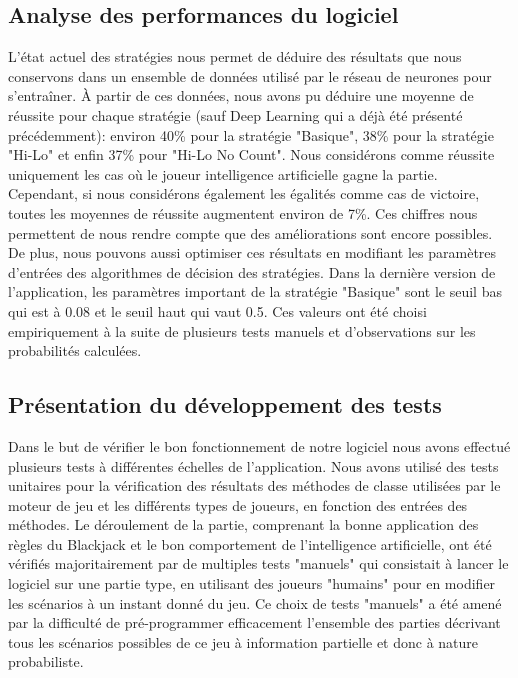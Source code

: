\subsection{Analyse des performances du logiciel}
L'état actuel des stratégies nous permet de déduire des résultats que nous conservons dans un ensemble de données utilisé par le réseau de neurones pour s'entraîner. À partir de ces données, nous avons pu déduire une moyenne de réussite pour chaque stratégie (sauf Deep Learning qui a déjà été présenté précédemment): environ 40\% pour la stratégie "Basique", 38\% pour la stratégie "Hi-Lo" et enfin 37\% pour "Hi-Lo No Count". Nous considérons comme réussite uniquement les cas où le joueur intelligence artificielle gagne la partie. Cependant, si nous considérons également les égalités comme cas de victoire, toutes les moyennes de réussite augmentent environ de 7\%. Ces chiffres nous permettent de nous rendre compte que des améliorations sont encore possibles. De plus, nous pouvons aussi optimiser ces résultats en modifiant les paramètres d'entrées des algorithmes de décision des stratégies. Dans la dernière version de l'application, les paramètres important de la stratégie "Basique" sont le seuil bas qui est à 0.08 et le seuil haut qui vaut 0.5. Ces valeurs ont été choisi empiriquement à la suite de plusieurs tests manuels et d'observations sur les probabilités calculées.

\subsection{Présentation du développement des tests}
Dans le but de vérifier le bon fonctionnement de notre logiciel nous avons effectué plusieurs tests à différentes échelles de l'application. Nous avons utilisé des tests unitaires pour la vérification des résultats des méthodes de classe utilisées par le moteur de jeu et les différents types de joueurs, en fonction des entrées des méthodes. Le déroulement de la partie, comprenant la bonne application des règles du Blackjack et le bon comportement de l'intelligence artificielle, ont été vérifiés majoritairement par de multiples tests "manuels" qui consistait à lancer le logiciel sur une partie type, en utilisant des joueurs "humains" pour en modifier les scénarios à un instant donné du jeu. Ce choix de tests "manuels" a été amené par la difficulté de pré-programmer efficacement l'ensemble des parties décrivant tous les scénarios possibles de ce jeu à information partielle et donc à nature probabiliste.

